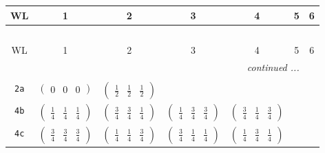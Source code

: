 \documentclass[fleqn,9pt,landscape]{jsarticle}
\begin{document}
\begin{center}
\renewcommand{\arraystretch}{1.2}
\begin{longtable}{ccccccc}
 \hline \hline
WL & 1 & 2 & 3 & 4 & 5 & 6 \\ \hline \endfirsthead

\multicolumn{6}{l}{\tablename\ \thetable{}} \\
 \hline \hline
WL & 1 & 2 & 3 & 4 & 5 & 6 \\ \hline \endhead

 \hline \hline
\multicolumn{6}{r}{\footnotesize\it continued ...} \\ \endfoot

 \hline \hline
\multicolumn{6}{r}{} \\ \endlastfoot

{\tt 2a} & $ \begin{pmatrix} 0 & 0 & 0 \end{pmatrix} $ & $ \begin{pmatrix} \frac{1}{2} & \frac{1}{2} & \frac{1}{2} \end{pmatrix} $ & $  $ & $  $ & $  $ & $  $ \\ \hline
{\tt 4b} & $ \begin{pmatrix} \frac{1}{4} & \frac{1}{4} & \frac{1}{4} \end{pmatrix} $ & $ \begin{pmatrix} \frac{3}{4} & \frac{3}{4} & \frac{1}{4} \end{pmatrix} $ & $ \begin{pmatrix} \frac{1}{4} & \frac{3}{4} & \frac{3}{4} \end{pmatrix} $ & $ \begin{pmatrix} \frac{3}{4} & \frac{1}{4} & \frac{3}{4} \end{pmatrix} $ & $  $ & $  $ \\ \hline
{\tt 4c} & $ \begin{pmatrix} \frac{3}{4} & \frac{3}{4} & \frac{3}{4} \end{pmatrix} $ & $ \begin{pmatrix} \frac{1}{4} & \frac{1}{4} & \frac{3}{4} \end{pmatrix} $ & $ \begin{pmatrix} \frac{3}{4} & \frac{1}{4} & \frac{1}{4} \end{pmatrix} $ & $ \begin{pmatrix} \frac{1}{4} & \frac{3}{4} & \frac{1}{4} \end{pmatrix} $ & $  $ & $  $ \\ \hline

\end{longtable}
\end{center}
\end{document}
